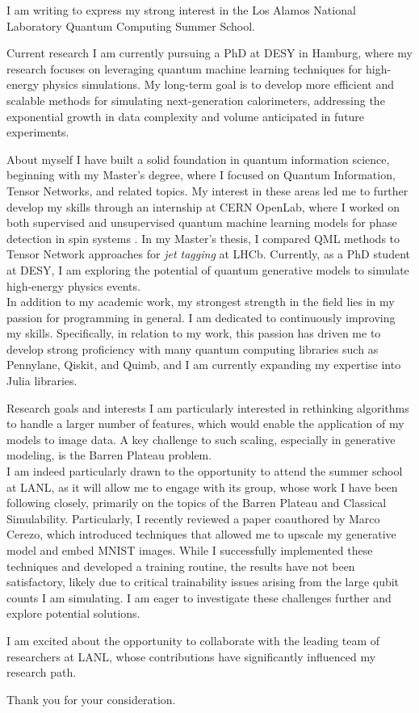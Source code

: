 I am writing to express my strong interest in the Los Alamos National Laboratory Quantum Computing Summer School.

\begin{point}{Current research}
	I am currently pursuing a PhD at DESY in Hamburg, where my research focuses on leveraging quantum machine learning techniques for high-energy physics simulations.
	My long-term goal is to develop more efficient and scalable methods for simulating next-generation calorimeters, addressing the exponential growth in data complexity and volume anticipated in future experiments.
\end{point}

\begin{point}{About myself}
	I have built a solid foundation in quantum information science, beginning with my Master's degree, where I focused on Quantum Information, Tensor Networks, and related topics. My interest in these areas led me to further develop my skills through an internship at CERN OpenLab, where I worked on both supervised and unsupervised quantum machine learning models for phase detection in spin systems \cite{ANNNIcern}. In my Master’s thesis, I compared QML methods to Tensor Network approaches for \emph{jet tagging} at LHCb. Currently, as a PhD student at DESY, I am exploring the potential of quantum generative models to simulate high-energy physics events.\\
	In addition to my academic work, my strongest strength in the field lies in my passion for programming in general. I am dedicated to continuously improving my skills. Specifically, in relation to my work, this passion has driven me to develop strong proficiency with many quantum computing libraries such as Pennylane, Qiskit, and Quimb, and I am currently expanding my expertise into Julia libraries.
\end{point}

\begin{point}{Research goals and interests}
	I am particularly interested in rethinking algorithms to handle a larger number of features, which would enable the application of my models to image data. A key challenge to such scaling, especially in generative modeling, is the Barren Plateau problem.\\
	I am indeed particularly drawn to the opportunity to attend the summer school at LANL, as it will allow me to engage with its group, whose work I have been following closely, primarily on the topics of the Barren Plateau and Classical Simulability.
	Particularly, I recently reviewed a paper \cite{zoe} coauthored by Marco Cerezo, which introduced techniques that allowed me to upscale my generative model and embed MNIST images. While I successfully implemented these techniques and developed a training routine, the results have not been satisfactory, likely due to critical trainability issues arising from the large qubit counts I am simulating. I am eager to investigate these challenges further and explore potential solutions.
\end{point}

I am excited about the opportunity to collaborate with the leading team of researchers at LANL, whose contributions have significantly influenced my research path.

Thank you for your consideration.
